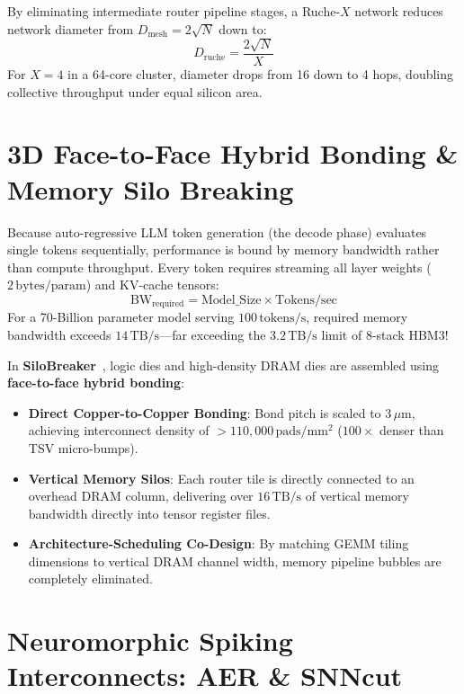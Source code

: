 By eliminating intermediate router pipeline stages, a Ruche-$X$ network reduces network diameter from $D_{\mathrm{mesh}} = 2\sqrt{N}$ down to:
\begin{equation}
D_{\mathrm{ruche}} = \frac{2\sqrt{N}}{X}
\end{equation}
For $X = 4$ in a 64-core cluster, diameter drops from 16 down to 4 hops, doubling collective throughput under equal silicon area.

\section{3D Face-to-Face Hybrid Bonding \& Memory Silo Breaking}
\label{sec:hybrid-bonding-silos}

Because auto-regressive LLM token generation (the decode phase) evaluates single tokens sequentially, performance is bound by memory bandwidth rather than compute throughput. Every token requires streaming all layer weights ($2\,\mathrm{bytes/param}$) and KV-cache tensors:
\begin{equation}
\mathrm{BW}_{\mathrm{required}} = \mathrm{Model\_Size} \times \mathrm{Tokens/sec}
\end{equation}
For a 70-Billion parameter model serving $100\,\mathrm{tokens/s}$, required memory bandwidth exceeds $14\,\mathrm{TB/s}$—far exceeding the $3.2\,\mathrm{TB/s}$ limit of 8-stack HBM3!

In \textbf{SiloBreaker}~\cite{Wu2026Silo}, logic dies and high-density DRAM dies are assembled using \textbf{face-to-face hybrid bonding}:
\begin{itemize}
    \item \textbf{Direct Copper-to-Copper Bonding}: Bond pitch is scaled to $3\,\mu\mathrm{m}$, achieving interconnect density of $>110{,}000\,\mathrm{pads/mm^2}$ ($100\times$ denser than TSV micro-bumps).
    \item \textbf{Vertical Memory Silos}: Each router tile is directly connected to an overhead DRAM column, delivering over $16\,\mathrm{TB/s}$ of vertical memory bandwidth directly into tensor register files.
    \item \textbf{Architecture-Scheduling Co-Design}: By matching GEMM tiling dimensions to vertical DRAM channel width, memory pipeline bubbles are completely eliminated.
\end{itemize}

\section{Neuromorphic Spiking Interconnects: AER \& SNNcut}
\label{sec:neuromorphic-snncut}

